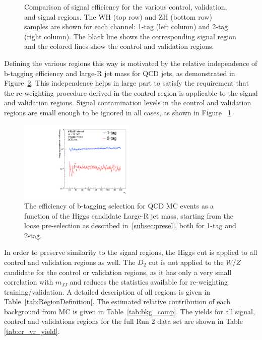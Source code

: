 \begin{figure}[htbp!]
\begin{center}
\end{center}
\caption{
    Comparison of signal efficiency for the various control, validation, and signal regions. The WH (top row) and ZH (bottom row) samples are shown for each channel: 1-tag (left column) and 2-tag (right column).
    The black line shows the corresponding signal region and the colored lines show the control and validation regions.
}
\label{fig:sig_contam}
\end{figure}

Defining the various regions this way is motivated by the relative independence of b-tagging efficiency and large-R jet mass for QCD jets, as demonstrated in Figure~\ref{fig:bkg_btag_eff}.
This independence helps in large part to satisfy the requirement that the re-weighting procedure derived in the control region is applicable to the signal and validation regions.
Signal contamination levels in the control and validation regions are small enough to be ignored in all cases, as shown in Figure ~\ref{fig:sig_contam}. 

\begin{figure}[htbp!]
\begin{center}
    \includegraphics[width=0.49\textwidth]{PlotBtagRej_mH.pdf}
\end{center}
\caption{The efficiency of b-tagging selection for QCD MC events as a function of the Higgs candidate Large-R jet mass, starting from the loose pre-selection as described in~\ref{subsec:presel}, both for 1-tag and 2-tag. }
\label{fig:bkg_btag_eff}
\end{figure}

In order to preserve similarity to the signal regions, the Higgs \ntrk cut is applied to all control and validation regions as well.
The $D_2$ cut is not applied to the $W/Z$ candidate for the control or validation regions, as it has only a very small correlation with $m_{JJ}$ and reduces the statistics available for re-weighting training/validation.
A detailed description of all regions is given in Table~\ref{tab:RegionDefinition}.
The estimated relative contribution of each background from MC is given in Table~\ref{tab:bkg_comp}.
The yields for all signal, control and validations regions for the full Run 2 data set are shown in Table \ref{tab:cr_vr_yield}.

